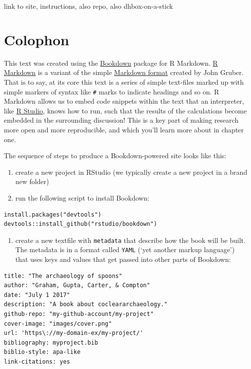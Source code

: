 \documentclass[english,]{book}
\providecommand{\tightlist}{%
  \setlength{\itemsep}{0pt}\setlength{\parskip}{0pt}}
\begin{document}
link to site, instructions, also repo, also dhbox-on-a-stick

\section*{Colophon}\label{colophon}

This text was created using the \href{http://bookdown.org}{Bookdown}
package for R Markdown. \href{http://rmarkdown.rstudio.com/}{R Markdown}
is a variant of the simple
\href{https://daringfireball.net/projects/markdown/}{Markdown format}
created by John Gruber. That is to say, at its core this text is a
series of simple text-files marked up with simple markers of syntax like
\texttt{\#} marks to indicate headings and so on. R Markdown allows us
to embed code snippets within the text that an interpreter, like
\href{https://www.rstudio.com/}{R Studio}, knows how to run, such that
the results of the calculations become embedded in the surrounding
discussion! This is a key part of making research more open and more
reproducible, and which you'll learn more about in chapter one.

The sequence of steps to produce a Bookdown-powered site looks like
this:

\begin{enumerate}
\def\labelenumi{\arabic{enumi}.}
\tightlist
\item
  create a new project in RStudio (we typically create a new project in
  a brand new folder)
\item
  run the following script to install Bookdown:
\end{enumerate}

\begin{verbatim}
install.packages("devtools")
devtools::install_github("rstudio/bookdown")
\end{verbatim}

\begin{enumerate}
\def\labelenumi{\arabic{enumi}.}
\setcounter{enumi}{2}
\tightlist
\item
  create a new textfile with \texttt{metadata} that describe how the
  book will be built. The metadata is in a format called \texttt{YAML}
  (`yet another markup language') that uses keys and values that get
  passed into other parts of Bookdown:
\end{enumerate}

\begin{verbatim}
title: "The archaeology of spoons"
author: "Graham, Gupta, Carter, & Compton"
date: "July 1 2017"
description: "A book about cocleararchaeology."
github-repo: "my-github-account/my-project"
cover-image: "images/cover.png"
url: 'https\://my-domain-ex/my-project/'
bibliography: myproject.bib
biblio-style: apa-like
link-citations: yes
\end{verbatim}
\end{document}
